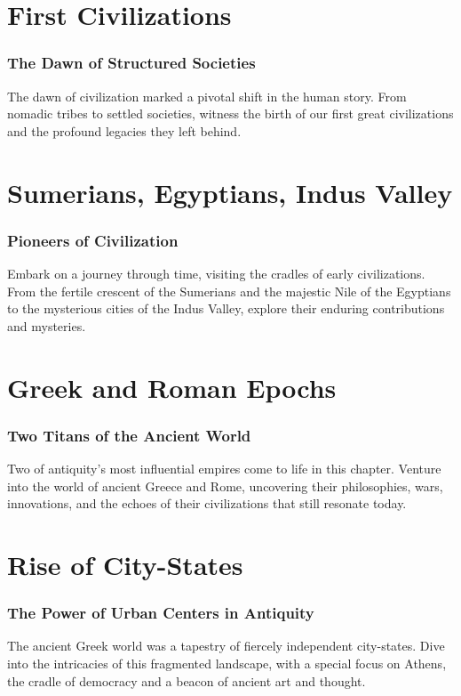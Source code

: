 \documentclass[a4paper,12pt]{book}
\begin{document}
\chapter{First Civilizations}
\subsection*{The Dawn of Structured Societies}
The dawn of civilization marked a pivotal shift in the human story. From nomadic tribes to settled societies, witness the birth of our first great civilizations and the profound legacies they left behind.

\chapter{Sumerians, Egyptians, Indus Valley}
\subsection*{Pioneers of Civilization}
Embark on a journey through time, visiting the cradles of early civilizations. From the fertile crescent of the Sumerians and the majestic Nile of the Egyptians to the mysterious cities of the Indus Valley, explore their enduring contributions and mysteries.

\chapter{Greek and Roman Epochs}
\subsection*{Two Titans of the Ancient World}
Two of antiquity's most influential empires come to life in this chapter. Venture into the world of ancient Greece and Rome, uncovering their philosophies, wars, innovations, and the echoes of their civilizations that still resonate today.

\chapter{Rise of City-States}
\subsection*{The Power of Urban Centers in Antiquity}
The ancient Greek world was a tapestry of fiercely independent city-states. Dive into the intricacies of this fragmented landscape, with a special focus on Athens, the cradle of democracy and a beacon of ancient art and thought.
\end{document}
